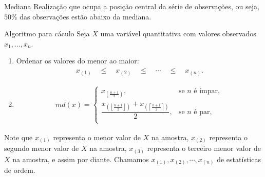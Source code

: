 \documentclass[8pt]{beamer}
\begin{document}
\begin{frame}{}
  \begin{block}{Mediana}
   Realização que ocupa a posição central da série de observações, ou seja, $50\%$ das observações estão abaixo da mediana.
  \end{block}

  \begin{block}{Algoritmo para cáculo}
  Seja $X$ uma variável quantitativa com valores observados $x_1, \dots, x_n$.
  \begin{enumerate}[1)]
   \item Ordenar os valores  do menor ao maior:
   \begin{align*}
    x_{(1)} \quad \leq \quad x_{(2)} \quad \leq \quad \cdots \quad \leq \quad x_{(n)}.
   \end{align*}
   \item \begin{align*}
          md(x) = \begin{cases}
                   x_{\left( \frac{n+1}{2}\right)}, & \mbox{se } n \mbox{ é ímpar},\\
                  \dfrac{ x_{\left( \left\lfloor \frac{n+1}{2} \right\rfloor \right)}+x_{\left( \left\lceil \frac{n+1}{2} \right\rceil \right)} }{2}, & \mbox{se } n \mbox{ é par},\\
                  \end{cases}
         \end{align*}

  \end{enumerate}
  \end{block}
  Note que $x_{(1)}$ representa o menor valor de $X$ na amostra, $x_{(2)}$ representa o segundo menor valor de $X$ na amostra, $x_{(3)}$ representa o terceiro menor valor de $X$ na amostra, e assim por 
  diante. Chamamos $x_{(1)}, x_{(2)}, \cdots, x_{(n)}$ de estatísticas de ordem.
\end{frame}
\end{document}
